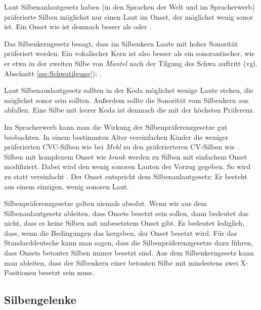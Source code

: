 Laut Silbenanlautgesetz haben (in den Sprachen der Welt und im Spracherwerb) präferierte Silben möglichst nur einen Laut im Onset, der möglichst wenig sonor ist. Ein Onset wie  ist demnach besser als  oder .

Das Silbenkerngesetz besagt, dass im Silbenkern Laute mit hoher Sonorität präferiert werden. Ein vokalischer Kern ist also besser als ein sonorantischer, wie er etwa in der zweiten Silbe von \textit{Mantel} nach der Tilgung des Schwa auftritt (vgl. Abschnitt \ref{sec:Schwatilgung}): .

Laut Silbenauslautgesetz sollten in der Koda möglichst wenige Laute stehen, die möglichst sonor sein sollten. Außerdem sollte die Sonorität vom Silbenkern aus abfallen. Eine Silbe mit leerer Koda ist demnach die mit der höchsten Präferenz.


Im Spracherwerb kann man die Wirkung der Silbenpräferenzgesetze gut beobachten. In einem bestimmten Alter vereinfachen Kinder die weniger präferierten CVC-Silben wie bei \textit{Mehl} zu den präferierteren CV-Silben wie \textipa{[me:]} \citep[25]{Falk2008}. Silben mit komplexem Onset wie \textit{krank}  werden zu Silben mit einfachem Onset modifiziert. Dabei wird den wenig sonoren Lauten der Vorzug gegeben. So wird   zu  statt  vereinfacht \citep[58]{Muelleretal2018}. Der Onset  entspricht dem Silbenanlautgesetz: Er besteht aus einem einzigen, wenig sonoren Laut.

Silbenpräferenzgesetze gelten niemals absolut. Wenn wir aus dem Silbenanlautgesetz ableiten, dass Onsets besetzt sein sollen, dann bedeutet das nicht, dass es keine Silben mit unbesetztem Onset gibt. Es bedeutet lediglich, dass, wenn die Bedingungen das hergeben, der Onset besetzt wird. Für das Standarddeutsche kann man sagen, dass die Silbenpräferenzgesetze dazu führen, dass Onsets betonter Silben immer besetzt sind. Aus dem Silbenkerngesetz kann man ableiten, dass der Silbenkern einer betonten Silbe mit mindestens zwei X-Positionen besetzt sein muss.

\subsection{Silbengelenke}\label{subsec:Silbengelenk}

